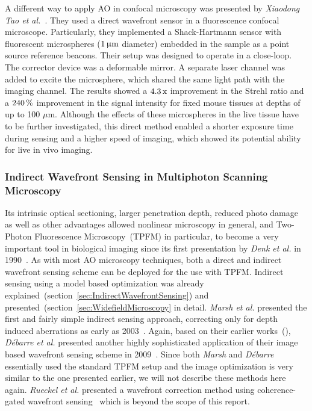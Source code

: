 A different way to apply AO in confocal microscopy was presented by \textit{Xiaodong Tao et al.}~\cite{scan_Confocal_direct_sensing}. They used a direct wavefront sensor in a fluorescence confocal microscope. Particularly, they implemented a Shack-Hartmann sensor with fluorescent microspheres ($\unit[1]{\upmu m}$ diameter) embedded in the sample as a point source reference beacons. Their setup was designed to operate in a close-loop. The corrector device was a deformable mirror. A separate laser channel was added to excite the microsphere, which shared the same light path with the imaging channel. The results showed a $\unit[4.3]{\text{x}}$ improvement in the Strehl ratio and a $\unit[240]{\%}$ improvement in the signal intensity for fixed mouse tissues at depths of up to 100 $\mu$m. Although the effects of these microspheres in the live tissue have to be further investigated, this direct method enabled a shorter exposure time during sensing and a higher speed of imaging, which showed its potential ability for live in vivo imaging.


\subsubsection{Indirect Wavefront Sensing in Multiphoton Scanning Microscopy}
\label{sec:MultiphotonScanningMicroscopyUsingIndirektSensing}

Its intrinsic optical sectioning, larger penetration depth, reduced photo damage as well as other advantages allowed nonlinear microscopy in general, and Two-Photon Fluorescence Microscopy~(TPFM) in particular, to become a very important tool in biological imaging since its first presentation by \emph{Denk et al.} in 1990~\cite{scan_TPFM_principle}. As with most AO microscopy techniques, both a direct and indirect wavefront sensing scheme can be deployed for the use with TPFM. Indirect sensing using a model based optimization was already explained~(section~\ref{sec:IndirectWavefrontSensing}) and presented~(section~\ref{sec:WidefieldMicroscopy} in detail. \emph{Marsh et al.} presented the first and fairly simple indirect sensing approach, correcting only for depth induced aberrations as early as 2003~\cite{scan_TPFM_pratical}. Again, based on their earlier works~(\cite{wide_AOM_loew_freq,wide_AOM_structured_illu}), \emph{D\'{e}barre et al.} presented another highly sophisticated application of their image based wavefront sensing scheme in 2009~\cite{scan_TPFM_image_based}. Since both \emph{Marsh} and \emph{D\'{e}barre} essentially used the standard TPFM setup and the image optimization is very similar to the one presented earlier, we will not describe these methods here again. \emph{Rueckel et al.} presented a wavefront correction method using coherence-gated wavefront sensing~\cite{scan_TPFM_gated_wavefront} which is beyond the scope of this report. 

